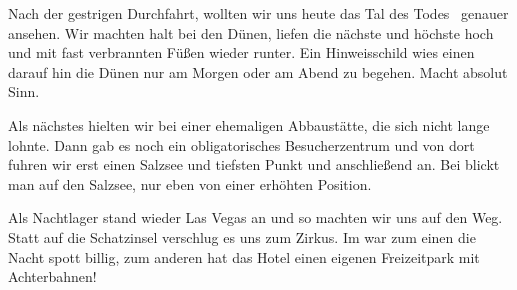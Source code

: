 Nach der gestrigen Durchfahrt, wollten wir uns heute das \glqq Tal des Todes \grqq\, genauer ansehen.
Wir machten halt bei den Dünen, liefen die nächste und höchste hoch und mit fast verbrannten Füßen wieder runter.
Ein Hinweisschild wies einen darauf hin die Dünen nur am Morgen oder am Abend zu begehen.
Macht absolut Sinn.

\thispagestyle{empty}
\newpage

Als nächstes hielten wir bei einer ehemaligen Abbaustätte, die sich nicht lange lohnte.
Dann gab es noch ein obligatorisches Besucherzentrum und von dort fuhren wir erst einen Salzsee und tiefsten Punkt  und anschließend  an.
Bei  blickt man auf den Salzsee, nur eben von einer erhöhten Position.

Als Nachtlager stand wieder Las Vegas an und so machten wir uns auf den Weg.
Statt auf die Schatzinsel verschlug es uns zum Zirkus.
Im  war zum einen die Nacht spott billig, zum anderen hat das Hotel einen eigenen Freizeitpark mit Achterbahnen!

\thispagestyle{empty}
\newpage

